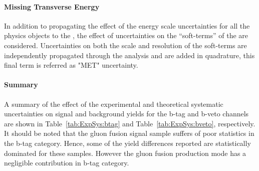 \paragraph{Missing Transverse Energy}
In addition to propagating the effect of the energy scale
uncertainties for all the physics objects to the \met, the effect of
uncertainties on the ``soft-terms'' of the \met are
considered. Uncertainties on both the scale and resolution of the
soft-terms are independently propagated through the analysis and are
added in quadrature, this final term is referred as "MET" uncertainty.


\paragraph{Summary} A summary of the effect of the experimental and theoretical systematic uncertainties on signal and background yields for the b-tag and b-veto channels are shown in Table~\ref{tab:ExpSys:btag} and Table~\ref{tab:ExpSys:bveto}, respectively. It should 
be noted that the gluon fusion  signal sample suffers of poor statistics in the b-tag category. 
Hence, some of the yield differences reported are statistically dominated for these samples.
However the gluon fusion production mode has a negligible contribution in b-tag category.
	
